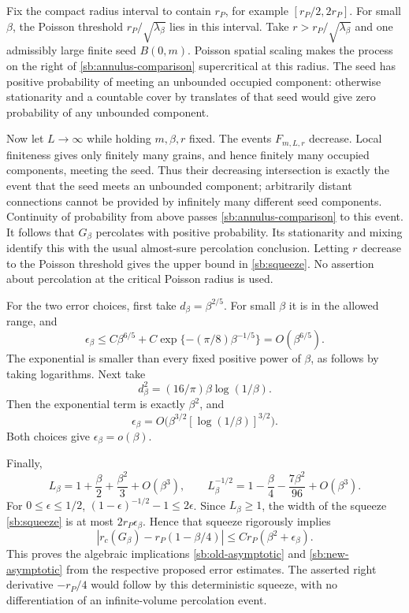 \documentclass[11pt,a4paper]{article}
\theoremstyle{definition}
\theoremstyle{remark}
\numberwithin{equation}{section}
\begin{document}
Fix the compact radius interval to contain $r_P$, for example
$[r_P/2,2r_P]$. For small $\beta$, the Poisson threshold
$r_P/\sqrt{\lambda_\beta}$ lies in this interval. Take
$r>r_P/\sqrt{\lambda_\beta}$ and one admissibly large finite seed
$B(0,m)$. Poisson spatial scaling makes the process on the right of
\eqref{sb:annulus-comparison} supercritical at this radius. The seed
has positive probability of meeting an unbounded occupied component:
otherwise stationarity and a countable cover by translates of that
seed would give zero probability of any unbounded component.

Now let $L\to\infty$ while holding $m,\beta,r$ fixed. The events
$F_{m,L,r}$ decrease. Local finiteness gives only finitely many grains,
and hence finitely many occupied components, meeting the seed. Thus
their decreasing intersection is exactly the event that the seed meets
an unbounded component; arbitrarily distant connections cannot be
provided by infinitely many different seed components. Continuity of
probability from above passes \eqref{sb:annulus-comparison} to this
event. It follows that $G_\beta$ percolates with positive probability.
Its stationarity and mixing identify this with the usual almost-sure
percolation conclusion. Letting $r$ decrease to the Poisson threshold
gives the upper bound in \eqref{sb:squeeze}. No assertion about
percolation at the critical Poisson radius is used.

For the two error choices, first take $d_\beta=\beta^{2/5}$. For small
$\beta$ it is in the allowed range, and
\[
 \epsilon_\beta\le C\beta^{6/5}
       +C\exp\{-(\pi/8)\beta^{-1/5}\}=O(\beta^{6/5}).
\]
The exponential is smaller than every fixed positive power of
$\beta$, as follows by taking logarithms. Next take
\[
 d_\beta^2=(16/\pi)\beta\log(1/\beta).
\]
Then the exponential term is exactly $\beta^2$, and
\begin{equation}
 \epsilon_\beta
  =O\bigl(\beta^{3/2}[\log(1/\beta)]^{3/2}\bigr).
 \label{sb:optimized-error}
\end{equation}
Both choices give $\epsilon_\beta=o(\beta)$.

Finally,
\[
 L_\beta=1+\frac\beta2+\frac{\beta^2}{3}+O(\beta^3),
 \qquad
 L_\beta^{-1/2}=1-\frac\beta4-\frac{7\beta^2}{96}+O(\beta^3).
\]
For $0\le\epsilon\le1/2$,
$(1-\epsilon)^{-1/2}-1\le2\epsilon$. Since $L_\beta\ge1$, the
width of the squeeze \eqref{sb:squeeze} is at most
$2r_P\epsilon_\beta$. Hence that squeeze rigorously implies
\[
 \left|r_c(G_\beta)-r_P(1-\beta/4)\right|
    \le C r_P(\beta^2+\epsilon_\beta).
\]
This proves the algebraic implications
\eqref{sb:old-asymptotic} and \eqref{sb:new-asymptotic} from the
respective proposed error estimates. The asserted right derivative
$-r_P/4$ would follow by this deterministic squeeze, with no
differentiation of an infinite-volume percolation event.
\end{document}
